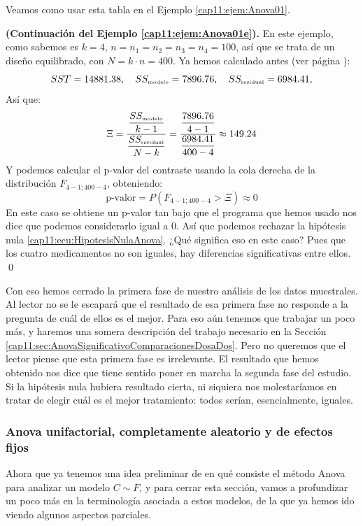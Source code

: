 \noindent Veamos como usar esta tabla en el Ejemplo \ref{cap11:ejem:Anova01}.
\begin{ejemplo}{\bf (Continuación del Ejemplo \ref{cap11:ejem:Anova01e}).}
\label{cap11:ejem:Anova01f}
En este ejemplo, como sabemos es $k=4$, $n=n_1=n_2=n_3=n_4=100$, así que se trata de un diseño equilibrado, con $N=k\cdot n=400$. Ya hemos calculado antes (ver página \pageref{cap11:ejem:Anova01e}):
\[SST=14881.38,\quad  SS_{\mbox{\tiny modelo}} = 7896.76, \quad  SS_{\mbox{\tiny residual}} = 6984.41,\]
Así que:
    \[
    \Xi=
    \dfrac{\dfrac{SS_{\mbox{\tiny modelo}}}{k-1}}{\dfrac{SS_{\mbox{\tiny residual}}}{N-k}}=\dfrac{\dfrac{7896.76}{4-1}}{\dfrac{6984.41}{400-4}}
    \approx 149.24
    \]
Y podemos calcular el p-valor del contraste usando la cola derecha de la distribución $F_{4-1;400-4}$, obteniendo:
\[\mbox{p-valor}=P\left(F_{4-1;400-4}>\Xi\right)\approx 0\]
En este caso se obtiene un p-valor tan bajo que el programa que hemos usado nos dice que podemos considerarlo igual a 0. Así que podemos rechazar la hipótesis nula \ref{cap11:ecu:HipotesisNulaAnova}. ¿Qué significa eso en este caso? Pues que los cuatro medicamentos no son iguales, hay diferencias significativas entre ellos. \qed
\end{ejemplo}
Con eso hemos cerrado la primera fase de nuestro análisis de los datos muestrales. Al lector no se le escapará que el resultado de esa primera fase no responde a la pregunta de cuál de ellos es el mejor. Para eso aún tenemos que trabajar un poco más, y haremos una somera descripción del trabajo necesario en la Sección \ref{cap11:sec:AnovaSignificativoComparacionesDosaDos}. Pero no queremos que el lector piense que esta primera fase es irrelevante. El resultado que hemos obtenido nos dice que tiene sentido poner en marcha la segunda fase del estudio. Si la hipótesis nula hubiera resultado cierta, ni siquiera nos molestaríamos en tratar de elegir cuál es el mejor tratamiento: todos serían, esencialmente, iguales.

\subsubsection{Anova unifactorial, completamente aleatorio y de efectos fijos}
\label{cap11:subsubsec:AnovaUnifactorialCompletamenteAleatorioEfectosFijos}

Ahora que ya tenemos una idea preliminar de en qué consiste el método Anova para analizar un modelo $C \sim F$, y para cerrar esta sección, vamos a profundizar un poco más en la terminología asociada a estos modelos, de la que ya hemos ido viendo algunos aspectos parciales.

